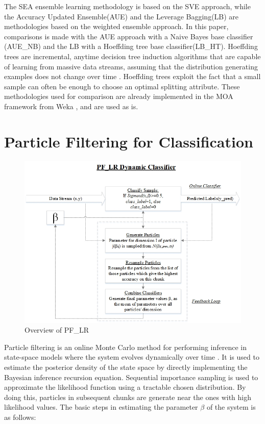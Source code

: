 \documentclass[conference]{IEEEtran}
\begin{document}
The SEA ensemble learning methodology \cite{Street and Kim(2001)} is based on the SVE approach, while the Accuracy Updated Ensemble(AUE) and the Leverage Bagging(LB) are methodologies based on the weighted ensemble approach. In this paper, comparisons is made with the AUE approach with a Naive Bayes base classifier (AUE\_NB) and the LB with a Hoeffding tree base classifier(LB\_HT). Hoeffding trees are incremental, anytime decision tree induction algorithms that are capable of learning from massive data streams, assuming that the distribution generating examples does not change over time \cite{Hoeglinger}. Hoeffding trees exploit the fact that a small sample can often be enough to choose an optimal splitting attribute. These methodologies used for comparison are already implemented in the MOA framework from Weka \cite{moa}, and are used as is. 


\section{Particle Filtering for Classification }

\begin{figure}
\captionsetup{justification=centering}
\centering
\includegraphics[scale=0.62]{fig/methodology.jpg}
\caption{Overview of PF\_LR }
\label{fig:blkoverall} 
\end{figure}

Particle filtering is an online Monte Carlo method for performing inference in state-space models where the system evolves dynamically over time \cite{Andrieu}. It is used to estimate the posterior density of the state space by directly implementing the Bayesian inference recursion equation. Sequential importance sampling is used to approximate the likelihood function using a tractable chosen distribution. By doing this, particles in subsequent chunks are generate near the ones with high likelihood values. The basic steps in estimating the parameter $\beta$ of the system is as follows:
\end{document}
